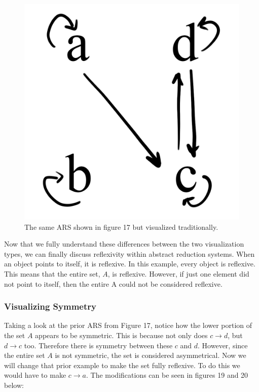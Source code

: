 \documentclass{article}
\begin{document}
\begin{figure}[H]
  \centering
  \includegraphics[scale=0.06]{v1}
  \caption[] {
    The same ARS shown in figure 17 but visualized traditionally.
    \endtabular}
\end{figure}

\medskip\noindent
Now that we fully understand these differences between the two visualization types, we can finally discuss reflexivity within abstract reduction systems. When an object points to itself, it is reflexive. In this example, every object is reflexive. This means that the entire set, $A$, is reflexive. However, if just one element did not point to itself, then the entire A could not be considered reflexive.

\subsubsection{Visualizing Symmetry}

\medskip\noindent
Taking a look at the prior ARS from Figure 17, notice how the lower portion of the set $A$ appears to be symmetric. This is because not only does $c \rightarrow d$, but $d \rightarrow c$ too. Therefore there is symmetry between these $c$ and $d$. However, since the entire set $A$ is not symmetric, the set is considered asymmetrical. Now we will change that prior example to make the set fully reflexive. To do this we would have to make $c \rightarrow a$. The modifications can be seen in figures 19 and 20 below:
\end{document}
